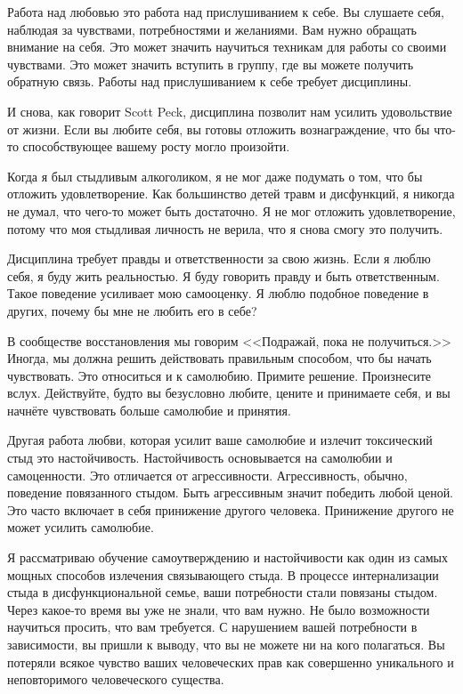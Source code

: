 \documentclass[10pt, fleqn]{article}
\begin{document}
Работа над любовью это работа над прислушиванием к себе. Вы слушаете себя, наблюдая за чувствами, потребностями и желаниями. Вам нужно обращать внимание на себя. Это может значить научиться техникам для работы со своими чувствами. Это может значить вступить в группу, где вы можете получить обратную связь. Работы над прислушиванием к себе требует дисциплины.

И снова, как говорит Scott Peck, дисциплина позволит нам усилить удовольствие от жизни. Если вы любите себя, вы готовы отложить вознаграждение, что бы что-то способствующее вашему росту могло произойти.

Когда я был стыдливым алкоголиком, я не мог даже подумать о том, что бы отложить удовлетворение. Как большинство детей травм и дисфункций, я никогда не думал, что чего-то может быть достаточно. Я не мог отложить удовлетворение, потому что моя стыдливая личность не верила, что я снова смогу это получить.

Дисциплина требует правды и ответственности за свою жизнь. Если я люблю себя, я буду жить реальностью. Я буду говорить правду и быть ответственным. Такое поведение усиливает мою самооценку. Я люблю подобное поведение в других, почему бы мне не любить его в себе?

В сообществе восстановления мы говорим <<Подражай, пока не получиться.>> Иногда, мы должна решить действовать правильным способом, что бы начать чувствовать. Это относиться и к самолюбию. Примите решение. Произнесите вслух. Действуйте, будто вы безусловно любите, цените и принимаете себя, и вы начнёте чувствовать больше самолюбие и принятия.


Другая работа любви, которая усилит ваше самолюбие и излечит токсический стыд это настойчивость. Настойчивость основывается на самолюбии и самоценности. Это отличается от агрессивности. Агрессивность, обычно, поведение повязанного стыдом. Быть агрессивным значит победить любой ценой. Это часто включает в себя принижение другого человека. Принижение другого не может усилить самолюбие.

Я рассматриваю обучение самоутверждению и настойчивости как один из самых мощных способов излечения связывающего стыда. В процессе интернализации стыда в дисфункциональной семье, ваши потребности стали повязаны стыдом. Через какое-то время вы уже не знали, что вам нужно. Не было возможности научиться просить, что вам требуется. С нарушением вашей потребности в зависимости, вы пришли к выводу, что вы не можете ни на кого полагаться. Вы потеряли всякое чувство ваших человеческих прав как совершенно уникального и неповторимого человеческого существа.
\end{document}
